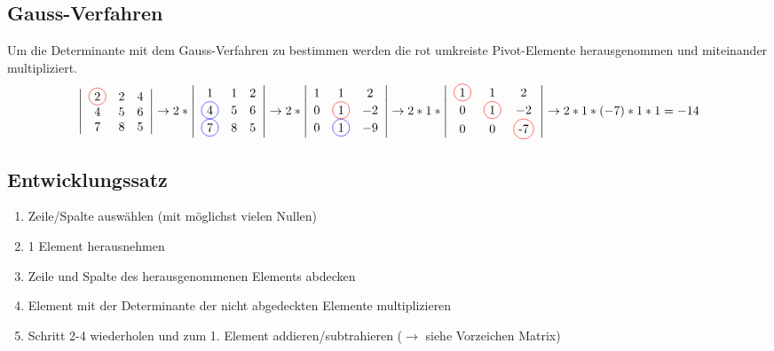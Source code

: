 \subsection{Gauss-Verfahren}
	 Um die Determinante mit dem Gauss-Verfahren zu bestimmen werden die rot umkreiste Pivot-Elemente herausgenommen und miteinander multipliziert.
	\begin{equation*}
		\left|\begin{array}{ccc}
			\circledr{2} & 2 & 4 \\
				4 & 5 & 6 \\
				7 & 8 & 5 \\
		\end{array}\right| 
		\rightarrow %
		2*
		\left|\begin{array}{ccc}	
			1 & 1 & 2 \\
			\circledb{4} & 5 & 6 \\
			\circledb{7} & 8 & 5 \\
		\end{array}\right|
		\rightarrow
		2*
		\left|\begin{array}{ccc}	
		1 & 1 & 2 \\
		0 & \circledr{1} & -2 \\
		0 & \circledb{1} & -9 \\
		\end{array}\right|
		\rightarrow
		2*1*
		\left|\begin{array}{ccc}	
		\circledr{1} & 1 & 2 \\
		0 & \circledr{1} & -2 \\
		0 & 0 & \circledr{-7} \\
		\end{array}\right|
		\rightarrow
		2*1*(-7)*1*1=-14
	\end{equation*}

\subsection{Entwicklungssatz}
	\begin{enumerate}
		\item Zeile/Spalte auswählen (mit möglichst vielen Nullen)
		\item 1 Element herausnehmen
		\item Zeile und Spalte des herausgenommenen Elements abdecken
		\item Element mit der Determinante der nicht abgedeckten Elemente multiplizieren
		\item Schritt 2-4 wiederholen und zum 1. Element addieren/subtrahieren ($\rightarrow$ siehe Vorzeichen Matrix)
	\end{enumerate}
	

